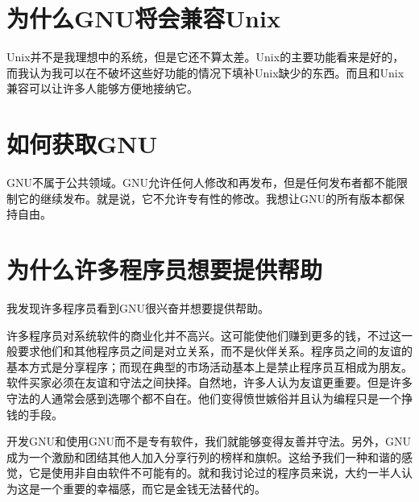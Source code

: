 \documentclass{book}
\begin{document}
\section{为什么GNU将会兼容Unix}
Unix并不是我理想中的系统，但是它还不算太差。Unix的主要功能看来是好的，而我认为我可以在不破坏这些好功能的情况下填补Unix缺少的东西。而且和Unix兼容可以让许多人能够方便地接纳它。\par
\section{如何获取GNU}
GNU不属于公共领域。GNU允许任何人修改和再发布，但是任何发布者都不能限制它的继续发布。就是说，它不允许专有性的修改。我想让GNU的所有版本都保持自由。\par
\section{为什么许多程序员想要提供帮助}
我发现许多程序员看到GNU很兴奋并想要提供帮助。\par
许多程序员对系统软件的商业化并不高兴。这可能使他们赚到更多的钱，不过这一般要求他们和其他程序员之间是对立关系，而不是伙伴关系。程序员之间的友谊的基本方式是分享程序；而现在典型的市场活动基本上是禁止程序员互相成为朋友。软件买家必须在友谊和守法之间抉择。自然地，许多人认为友谊更重要。但是许多守法的人通常会感到选哪个都不自在。他们变得愤世嫉俗并且认为编程只是一个挣钱的手段。\par
开发GNU和使用GNU而不是专有软件，我们就能够变得友善并守法。另外，GNU成为一个激励和团结其他人加入分享行列的榜样和旗帜。这给予我们一种和谐的感觉，它是使用非自由软件不可能有的。就和我讨论过的程序员来说，大约一半人认为这是一个重要的幸福感，而它是金钱无法替代的。\par
\end{document}
